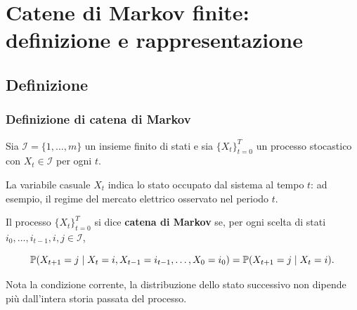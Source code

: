 

\section{Catene di Markov finite: definizione e rappresentazione}

\subsection{Definizione}%

\begin{frame}%
%

\frametitle{Definizione di catena di Markov}%
%

%


Sia $\mathcal{I}=\{1,\ldots,m\}$ un insieme finito di stati e sia
$\{X_{t}\}_{t=0}^{T}$ un processo stocastico con $X_{t}\in\mathcal{I}$ per
ogni $t$.

\medskip

La variabile casuale $X_{t}$ indica lo stato occupato dal sistema al tempo
$t$: ad esempio, il regime del mercato elettrico osservato nel periodo $t$.

\medskip

Il processo $\{X_{t}\}_{t=0}^{T}$ si dice \textbf{catena di Markov} se, per
ogni scelta di stati $i_{0},\ldots,i_{t-1},i,j\in\mathcal{I}$,%

\[
\mathbb{P}(X_{t+1}=j \mid X_{t}=i, X_{t-1}=i_{t-1}, \ldots, X_{0}=i_{0}) =
\mathbb{P}(X_{t+1}=j \mid X_{t}=i).
\]


\medskip

\begin{center}
{\small Nota la condizione corrente, la distribuzione dello stato successivo
non dipende pi\`{u} dall'intera storia passata del processo.}
\end{center}

%

\transboxout
\end{frame}%


